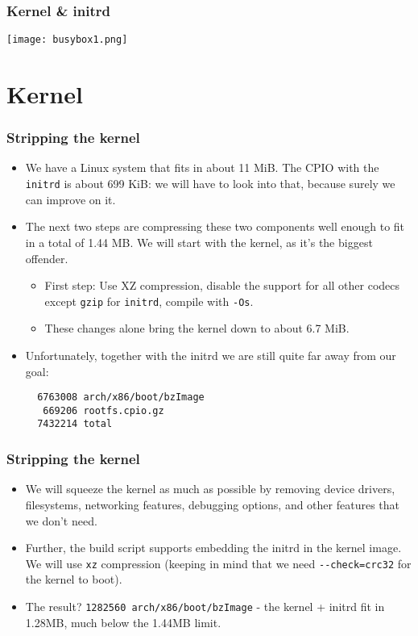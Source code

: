 \documentclass{beamer}
\begin{document}
\begin{frame}[t,fragile]
\frametitle{Kernel \& initrd}
\begin{center}
  \texttt{[image: busybox1.png]}
\end{center}
\end{frame}

\section{Kernel}
\begin{frame}[t,fragile]
\frametitle{Stripping the kernel}
\begin{itemize}
  \item We have a Linux system that fits in about 11 MiB. The CPIO with the \verb|initrd| is about 699 KiB: we will have to look into that, because surely we can improve on it.
  \item The next two steps are compressing these two components well enough to fit in a total of 1.44 MB. We will start with the kernel, as it's the biggest offender.
  \begin{itemize}
    \item First step: Use XZ compression, disable the support for all other codecs except \verb|gzip| for \verb|initrd|, compile with \verb|-Os|.
    \item These changes alone bring the kernel down to about 6.7 MiB.
  \end{itemize}
  \item Unfortunately, together with the initrd we are still quite far away from our goal:
\begin{Verbatim}
  6763008 arch/x86/boot/bzImage
   669206 rootfs.cpio.gz
  7432214 total
\end{Verbatim}
\end{itemize}
\end{frame}

\begin{frame}[t,fragile]
\frametitle{Stripping the kernel}
\begin{itemize}
  \item We will squeeze the kernel as much as possible by removing device drivers, filesystems, networking features, debugging options, and other features that we don't need.
  \item Further, the build script supports embedding the initrd in the kernel image. We will use \verb|xz| compression (keeping in mind that we need \verb|--check=crc32| for the kernel to boot).
  \item The result? \verb|1282560 arch/x86/boot/bzImage| - the kernel + initrd fit in 1.28MB, much below the 1.44MB limit.
\end{itemize}
\end{frame}
\end{document}
